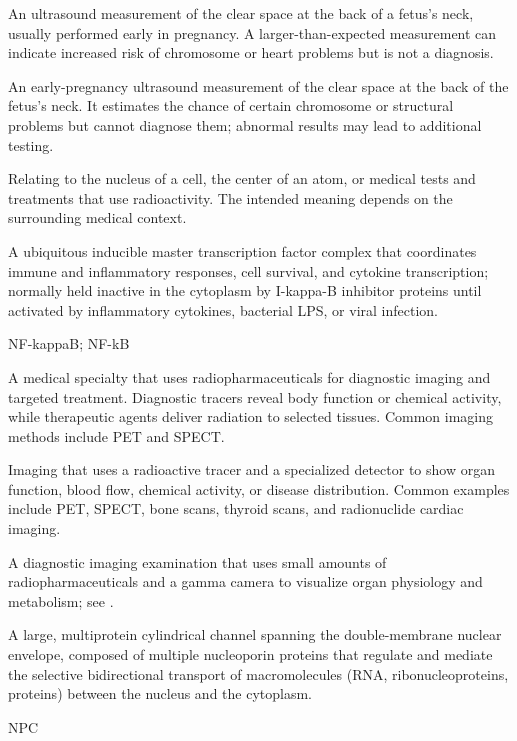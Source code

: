  An ultrasound measurement of the clear space at the back of a fetus’s neck, usually performed early in pregnancy. A larger-than-expected measurement can indicate increased risk of chromosome or heart problems but is not a diagnosis.

 An early-pregnancy ultrasound measurement of the clear space at the back of the fetus’s neck. It estimates the chance of certain chromosome or structural problems but cannot diagnose them; abnormal results may lead to additional testing.

 Relating to the nucleus of a cell, the center of an atom, or medical tests and treatments that use radioactivity. The intended meaning depends on the surrounding medical context.

 A ubiquitous inducible master transcription factor complex that coordinates immune and inflammatory responses, cell survival, and cytokine transcription; normally held inactive in the cytoplasm by I-kappa-B inhibitor proteins until activated by inflammatory cytokines, bacterial LPS, or viral infection.

\synonyms
NF-kappaB; NF-kB

 A medical specialty that uses radiopharmaceuticals for diagnostic imaging and targeted treatment. Diagnostic tracers reveal body function or chemical activity, while therapeutic agents deliver radiation to selected tissues. Common imaging methods include PET and SPECT.

 Imaging that uses a radioactive tracer and a specialized detector to show organ function, blood flow, chemical activity, or disease distribution. Common examples include PET, SPECT, bone scans, thyroid scans, and radionuclide cardiac imaging.

 A diagnostic imaging examination that uses small amounts of radiopharmaceuticals and a gamma camera to visualize organ physiology and metabolism; see .

 A large, multiprotein cylindrical channel spanning the double-membrane nuclear envelope, composed of multiple nucleoporin proteins that regulate and mediate the selective bidirectional transport of macromolecules (RNA, ribonucleoproteins, proteins) between the nucleus and the cytoplasm.

\synonyms
NPC

